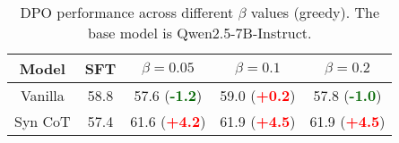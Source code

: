 \begin{table}[htb]
    \centering
\begin{adjustbox}{max width=\columnwidth}
    \begin{tabular}{c | c | c c c }
    \toprule
    Model & SFT & $\beta=0.05$ & $\beta=0.1$ & $\beta=0.2$ \\
    \midrule
    Vanilla & 58.8 & 57.6 (\textbf{\textcolor{darkgreen}{-1.2}}) & 59.0 (\textbf{\textcolor{red}{+0.2}}) & 57.8 (\textbf{\textcolor{darkgreen}{-1.0}})\\
    Syn CoT & 57.4 & 61.6 (\textbf{\textcolor{red}{+4.2}}) & 61.9 (\textbf{\textcolor{red}{+4.5}})& 61.9 (\textbf{\textcolor{red}{+4.5}}) \\
    \bottomrule
    \end{tabular}
\end{adjustbox}
\caption{DPO performance across different $\beta$ values (greedy). The base model is Qwen2.5-7B-Instruct.}
\label{table:RobBeta}
\end{table}